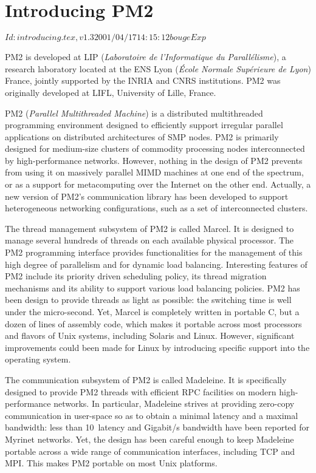 \chapter{Introducing PM2}

\stamp $Id: introducing.tex,v 1.3 2001/04/17 14:15:12 bouge Exp $

PM2 is developed at LIP (\emph{Laboratoire de l'Informatique du
  Parall\'elisme}), a research laboratory located at the ENS Lyon
(\emph{\'Ecole Normale Sup\'erieure de Lyon}) France, jointly
supported by the INRIA and CNRS institutions. PM2 was originally
developed at LIFL, University of Lille, France.
  
PM2 (\emph{Parallel Multithreaded Machine}) is a distributed
multithreaded programming environment designed to efficiently support
irregular parallel applications on distributed architectures of SMP
nodes. PM2 is primarily designed for medium-size clusters of commodity
processing nodes interconnected by high-performance networks. However,
nothing in the design of PM2 prevents from using it on massively
parallel MIMD machines at one end of the spectrum, or as a support for
metacomputing over the Internet on the other end. Actually, a new
version of PM2's communication library has been developed to support
heterogeneous networking configurations, such as a set of
interconnected clusters.

The thread management subsystem of PM2 is called Marcel. It is
designed to manage several hundreds of threads on each available
physical processor. The PM2 programming interface provides
functionalities for the management of this high degree of parallelism
and for dynamic load balancing. Interesting features of PM2 include
its priority driven scheduling policy, its thread migration mechanisms
and its ability to support various load balancing policies. PM2 has
been design to provide threads as light as possible: the switching
time is well under the micro-second. Yet, Marcel is completely written
in portable C, but a dozen of lines of assembly code, which makes it
portable across most processors and flavors of Unix systems, including
Solaris and Linux. However, significant improvements could been made
for Linux by introducing specific support into the operating system.

The communication subsystem of PM2 is called Madeleine. It is
specifically designed to provide PM2 threads with efficient RPC
facilities on modern high-performance networks. In particular,
Madeleine strives at providing zero-copy communication in user-space
so as to obtain a minimal latency and a maximal bandwidth: less than
10~\us latency and Gigabit/s bandwidth have been reported for
Myrinet networks.  Yet, the design has been careful enough to keep
Madeleine portable across a wide range of communication interfaces,
including TCP and MPI. This makes PM2 portable on most Unix
platforms.

